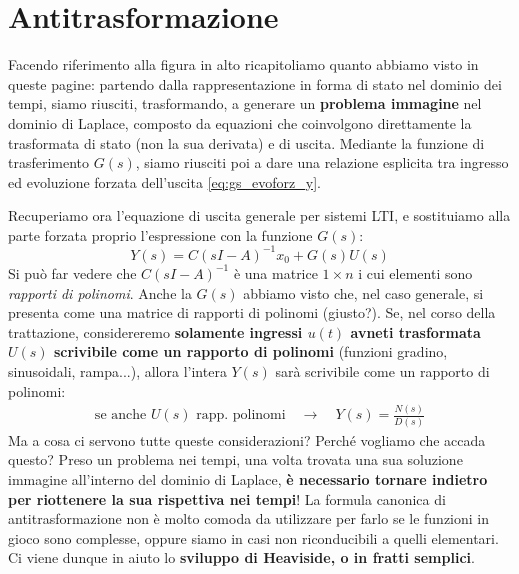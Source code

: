 \section{Antitrasformazione}
\bb
Facendo riferimento alla figura in alto ricapitoliamo quanto abbiamo visto in queste pagine: partendo dalla rappresentazione in forma di stato nel dominio dei tempi, siamo riusciti, trasformando, a generare un \textbf{problema immagine} nel dominio di Laplace, composto da equazioni che coinvolgono direttamente la trasformata di stato (non la sua derivata) e di uscita. Mediante la funzione di trasferimento $G(s)$, siamo riusciti poi a dare una relazione esplicita tra ingresso ed evoluzione forzata dell'uscita \eqref{eq:gs_evoforz_y}. 
\begin{defin}{}{}
Recuperiamo ora l'equazione di uscita generale per sistemi LTI, e sostituiamo alla parte forzata proprio l'espressione con la funzione $G(s)$:
\begin{equation*}
Y(s) = C(sI-A)^{-1} x_0 + G(s)U(s)
\end{equation*}
Si può far vedere che $C(sI-A)^{-1}$ è una matrice $1 \times n$ i cui elementi sono \textit{rapporti di polinomi}. Anche la $G(s)$ abbiamo visto che, nel caso generale, si presenta come una matrice di rapporti di polinomi (giusto?). Se, nel corso della trattazione,  considereremo \textbf{solamente ingressi $u(t)$ avneti trasformata $U(s)$ scrivibile come un rapporto di polinomi}  (funzioni gradino, sinusoidali, rampa...), allora l'intera $Y(s)$ sarà scrivibile come un rapporto di polinomi: 
\begin{align}
\label{eq:y_rapp_poli}
\textrm{se anche $U(s)$ rapp. polinomi} \quad \rightarrow \quad Y(s) = \frac{N(s)}{D(s)}
\end{align}
Ma a cosa ci servono tutte queste considerazioni? Perché vogliamo che accada questo? Preso un problema nei tempi, una volta trovata una sua soluzione immagine all'interno del dominio di Laplace, \textbf{è necessario tornare indietro per riottenere la sua rispettiva nei tempi}! La formula canonica di antitrasformazione non è molto comoda da utilizzare per farlo se le funzioni in gioco sono complesse, oppure siamo in casi non riconducibili a quelli elementari. Ci viene dunque in aiuto lo \textbf{sviluppo di Heaviside, o in fratti semplici}.

\end{defin}

